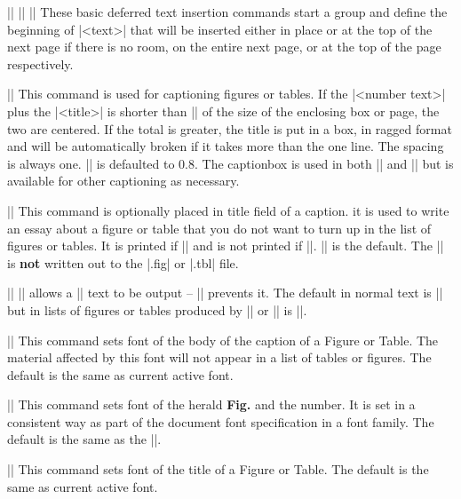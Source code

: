\endlist



\beginblockmode
\ext\@|\beginmidinsert|
\nbr
\ext\@|\beginpageinsert|
\nbr
\ext\@|\begintopinsert|
\nbr
These basic deferred text insertion commands start a group and define the
beginning of |<text>| that will be inserted either in place or at the top of
the next page if there is no room, on the entire next page, or at the top of
the page respectively.

\mbr
\ext\@||
\nbr
This command is used for captioning figures or tables. If the |<number text>|
plus the |<title>| is shorter than 
|\captiontextfraction|  of the size of the enclosing box or
page, the two are centered. If the total is greater, the title is put in a box,
in ragged format and will be automatically broken if it takes more than the
one line. The spacing is always one. |\captiontextfraction| is defaulted to
0.8.
The captionbox is used  in both |\figureform| and |\tableform| but is
available for other captioning as necessary. 

\mbr
\ext\@||
\nbr 
This command is optionally placed in title field of a caption. it is used to
write an essay about a figure or table that you do not want to turn up in the
list of figures or tables. It is printed if |\captionbodyon| and is not
printed if |\captionbodyoff|. |\captionbodyon| is the default. The
|\captionbody| is {\bf not} written out to the |.fig| or |.tbl| file.

\mbr
\ext\@|\captionbodyon \captionbodyoff| 
\nbr 
|\captionbodyon| allows a |\captionbody| text to be output -- 
|\captionbodyoff| prevents it. The default in normal text is |\captionbodyon|
but in lists of figures or tables produced by |\makefiglist| or
|\maketbllist| is |\captionbodyoff|.



\mbr
\ext\@|\captionbodyfont|
\nbr 
This command sets font of the body of the caption of a Figure or Table. 
The material affected by this font will not appear in a list of tables or
figures. 
The default is the same as current active font. 


\mbr
\ext\@|\captionnumfont|
\nbr 
This command sets font of the herald {\bf Fig.} and the number. 
It is set in a consistent way as part of the document font specification in a
font family. The default is the same as the |\ssheadfont|. 

\mbr
\ext\@|\captiontitlefont|
\nbr 
This command sets font of the title of a Figure or Table. 
The default is the same as current active font. 





